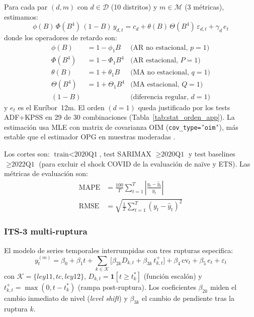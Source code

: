 \documentclass[10pt,a4paper,twocolumn]{article}
\newcommand{\MAPE}{\text{MAPE}}
\newcommand{\RMSE}{\text{RMSE}}
\begin{document}
Para cada par $(d, m)$ con $d \in \mathcal{D}$ (10 distritos) y $m \in \mathcal{M}$
(3 métricas), estimamos:
\begin{equation}
  \phi(B)\,\Phi(B^4)\,(1{-}B)\,y_{d,t}
  = c_d + \theta(B)\,\Theta(B^4)\,\varepsilon_{d,t}
    + \gamma_d\,e_t
  \label{eq:sarimax}
\end{equation}
donde los operadores de retardo son:
\begin{align*}
  \phi(B)   &= 1 - \phi_1 B        & \text{(AR no estacional, }p{=}1\text{)}\\
  \Phi(B^4) &= 1 - \Phi_1 B^4      & \text{(AR estacional, }P{=}1\text{)}\\
  \theta(B) &= 1 + \theta_1 B      & \text{(MA no estacional, }q{=}1\text{)}\\
  \Theta(B^4)&= 1 + \Theta_1 B^4  & \text{(MA estacional, }Q{=}1\text{)}\\
  (1{-}B)   &                      & \text{(diferencia regular, }d{=}1\text{)}
\end{align*}
y $e_t$ es el Euríbor~12m. El orden $(d{=}1)$ queda justificado por los tests
ADF+KPSS en 29 de 30 combinaciones (Tabla~\ref{tab:stat_orden_app}). La estimación
usa MLE con matrix de covarianza OIM (\texttt{cov\_type='oim'}), más estable que el
estimador OPG en muestras moderadas \citep{harvey1989forecasting}.

Los cortes son: $\text{train} < \text{2020Q1}$, test SARIMAX $\geq \text{2020Q1}$
y test baselines $\geq \text{2022Q1}$ (para excluir el shock COVID de la evaluación
de naïve y ETS). Las métricas de evaluación son:
\begin{align}
  \MAPE &= \frac{100}{T}\sum_{t=1}^T \left|\frac{y_t - \hat{y}_t}{y_t}\right|
  \label{eq:mape}\\
  \RMSE &= \sqrt{\frac{1}{T}\sum_{t=1}^T (y_t - \hat{y}_t)^2}
  \label{eq:rmse}
\end{align}

\subsubsection{ITS-3 multi-ruptura}

El modelo de series temporales interrumpidas con tres rupturas especifica:
\begin{equation}
  y_t^{(m)} = \beta_0 + \beta_1 t
    + \sum_{k \in \mathcal{K}}\!\bigl[\beta_{2k} D_{k,t} + \beta_{3k}\,t_{k,t}^+\bigr]
    + \beta_4\,\text{cv}_t + \beta_5\,e_t + \varepsilon_t
  \label{eq:its3}
\end{equation}
con $\mathcal{K}{=}\{ley11, tc, ley12\}$, $D_{k,t}{=}\mathbf{1}[t{\geq}t_k^*]$
(función escalón) y $t_{k,t}^+{=}\max(0,t{-}t_k^*)$ (rampa post-ruptura). Los
coeficientes $\beta_{2k}$ miden el cambio inmediato de nivel (\textit{level shift})
y $\beta_{3k}$ el cambio de pendiente tras la ruptura $k$.
\end{document}

